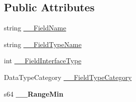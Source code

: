 \subsection*{Public Attributes}
\begin{DoxyCompactItemize}
\item 
string \hyperlink{classpc__emulator_1_1PCDataTypeField_a67da027aea5ba30e6c8edccf5c2b15ee}{\+\_\+\+\_\+\+Field\+Name}
\item 
string \hyperlink{classpc__emulator_1_1PCDataTypeField_ab43f2a1a7aa58ff241ed65fd16da750d}{\+\_\+\+\_\+\+Field\+Type\+Name}
\item 
int \hyperlink{classpc__emulator_1_1PCDataTypeField_ae3bcb0938843c949e652b92b53bdd421}{\+\_\+\+\_\+\+Field\+Interface\+Type}
\item 
Data\+Type\+Category \hyperlink{classpc__emulator_1_1PCDataTypeField_a6e8ad7acbf8e2b790f94e9080b64ef08}{\+\_\+\+\_\+\+Field\+Type\+Category}
\item 
s64 {\bfseries \+\_\+\+\_\+\+Range\+Min}\hypertarget{classpc__emulator_1_1PCDataTypeField_a79185925483e13c1350cde6a2833a55b}{}\label{classpc__emulator_1_1PCDataTypeField_a79185925483e13c1350cde6a2833a55b}


\end{DoxyCompactItemize}
